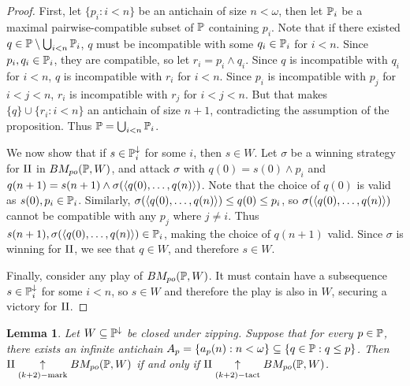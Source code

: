 \documentclass[11pt]{article}
\theoremstyle{plain}
\newtheorem{lemma}[theorem]{Lemma}
\theoremstyle{definition}
\theoremstyle{remark}
\theoremstyle{plain}
\theoremstyle{definition}
\theoremstyle{remark}
\newcommand{\bmPoGame}[2]{BM_{po}(#1,#2)}
\begin{document}
  \begin{proof}
    First, let \(\{p_i:i<n\}\) be an antichain of size \(n<\omega\),
    then let \(\mathbb{P}_i\) be a maximal pairwise-compatible subset of \(\mathbb{P}\)
    containing \(p_i\). Note that if there existed
    \(q\in\mathbb{P}\setminus\bigcup_{i<n}\mathbb{P}_i\),
    \(q\) must be incompatible with some \(q_i\in\mathbb{P}_i\) for \(i<n\).
    Since \(p_i,q_i\in\mathbb{P}_i\), they are compatible, so let
    \(r_i=p_i\wedge q_i\). Since \(q\) is incompatible with \(q_i\) for \(i<n\),
    \(q\) is incompatible with \(r_i\) for \(i<n\). Since \(p_i\) is
    incompatible with \(p_j\) for \(i<j<n\), \(r_i\) is incompatible with
    \(r_j\) for \(i<j<n\). But that makes \(\{q\}\cup\{r_i:i<n\}\) an
    antichain of size \(n+1\), contradicting the assumption of the proposition.
    Thus \(\mathbb{P}=\bigcup_{i<n}\mathbb{P}_i\).

    We now show that if \(s\in\mathbb{P}_i^\downarrow\) for some \(i\),
    then \(s\in W\). Let \(\sigma\) be a
    winning strategy for \(\mathrm{II}\) in \(\bmPoGame{\mb P}{W}\),
    and attack \(\sigma\) with \(q(0)=s(0)\wedge p_i\) and
    \(q(n+1)=s(n+1)\wedge\sigma(\langle q(0),\dots,q(n)\rangle)\). Note that the choice
    of \(q(0)\) is valid as \(s(0),p_i\in\mathbb{P}_i\). Similarly,
    \(\sigma(\langle q(0),\dots,q(n)\rangle)\leq q(0)\leq p_i\), so
    \(\sigma(\langle q(0),\dots,q(n)\rangle)\) cannot be compatible with any \(p_j\)
    where \(j\not=i\). Thus \(s(n+1),\sigma(\langle q(0),\dots,q(n)\rangle)\in\mathbb{P}_i\),
    making the choice of \(q(n+1)\) valid. Since \(\sigma\) is winning for
    \(\mathrm{II}\), we see that \(q\in W\), and therefore \(s\in W\).

    Finally, consider any play of \(\bmPoGame{\mb P}{W}\). It must contain
    have a subsequence \(s\in\mathbb{P}_i^\downarrow\) for some \(i<n\),
    so \(s\in W\) and therefore
    the play is also in \(W\), securing a victory for \(\mathrm{II}\).
  \end{proof}

  \begin{lemma}
    Let \(W\subseteq\mathbb{P}^\downarrow\) be closed under zipping.
    Suppose that for every \(p\in\mathbb{P}\), there exists an infinite
    antichain \(A_p=\{a_p(n):n<\omega\}\subseteq\{q\in\mathbb{P}:q\leq p\}\).
    Then \(\plII\kmarkwin{(k+2)}\bmPoGame{\mb P}{W}\) if and only if
    \(\plII\ktactwin{(k+2)}\bmPoGame{\mb P}{W}\).
  \end{lemma}
\end{document}
